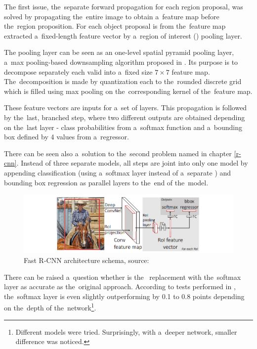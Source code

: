 The first issue, the~separate forward propagation for each region proposal, was 
solved by propagating the~entire image to obtain a~feature map before the~region 
proposition. For each object proposal is from the~feature map extracted
a~fixed-length feature vector by a~region of interest () pooling layer.

The  pooling layer can be seen as an one-level spatial pyramid pooling 
layer, a~max pooling-based downsampling algorithm proposed in \cite{spp}. Its 
purpose is to decompose separately each valid  into a~fixed size $7 
\times 7$ feature map. The~decomposition is made by quantization each  
to the~rounded discrete grid which is filled using max pooling on
the~corresponding kernel of the~feature map.

These feature vectors are inputs for a~set of  layers. This propagation 
is followed by the~last, branched step, where two different outputs are obtained 
depending on the~last layer - class probabilities from a~softmax function and
a~bounding box defined by 4 values from a~regressor.

There can be seen also a~solution to the~second problem named in chapter 
\ref{r-cnn}. Instead of three separate models, all steps are joint into only one 
model by appending classification (using a~softmax layer instead of a~separate 
) and bounding box regression as parallel layers to the~end of
the~model.

\begin{figure}[H]
   \centering
	\includegraphics[width=.9\linewidth]{./pictures/fastrcnn.png}
	\caption[Fast R-CNN architecture]{Fast R-CNN architecture schema, source: 
\cite{fast-rcnn}}
      \label{fig:fast-rcnn}
\end{figure}

There can be raised a~question whether is the~ replacement with
the~softmax layer as accurate as the~original approach. According to tests performed 
in \cite{fast-rcnn}, the~softmax layer is even slightly outperforming  
by 0.1 to 0.8  points depending on the~depth of
the~network\footnote{Different models were tried. Surprisingly, with a~deeper network, 
smaller  difference was noticed.}.

